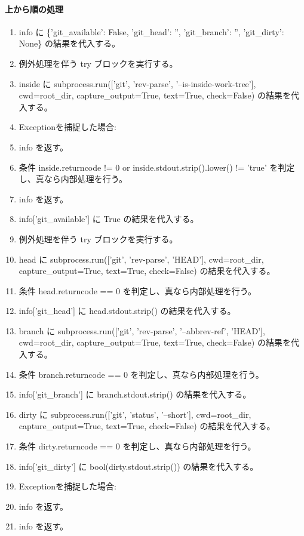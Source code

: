 \documentclass[a4paper,11pt]{article}
\begin{document}
            \paragraph{上から順の処理}
            \begin{enumerate}[leftmargin=1.8em]
            \item info に \{'git\_available': False, 'git\_head': '', 'git\_branch': '', 'git\_dirty': None\} の結果を代入する。
\item 例外処理を伴う try ブロックを実行する。
\item   inside に subprocess.run(['git', 'rev-parse', '--is-inside-work-tree'], cwd=root\_dir, capture\_output=True, text=True, check=False) の結果を代入する。
\item   Exceptionを捕捉した場合:
\item   info を返す。
\item 条件 inside.returncode != 0 or inside.stdout.strip().lower() != 'true' を判定し、真なら内部処理を行う。
\item   info を返す。
\item info['git\_available'] に True の結果を代入する。
\item 例外処理を伴う try ブロックを実行する。
\item   head に subprocess.run(['git', 'rev-parse', 'HEAD'], cwd=root\_dir, capture\_output=True, text=True, check=False) の結果を代入する。
\item   条件 head.returncode == 0 を判定し、真なら内部処理を行う。
\item     info['git\_head'] に head.stdout.strip() の結果を代入する。
\item   branch に subprocess.run(['git', 'rev-parse', '--abbrev-ref', 'HEAD'], cwd=root\_dir, capture\_output=True, text=True, check=False) の結果を代入する。
\item   条件 branch.returncode == 0 を判定し、真なら内部処理を行う。
\item     info['git\_branch'] に branch.stdout.strip() の結果を代入する。
\item   dirty に subprocess.run(['git', 'status', '--short'], cwd=root\_dir, capture\_output=True, text=True, check=False) の結果を代入する。
\item   条件 dirty.returncode == 0 を判定し、真なら内部処理を行う。
\item     info['git\_dirty'] に bool(dirty.stdout.strip()) の結果を代入する。
\item   Exceptionを捕捉した場合:
\item   info を返す。
\item info を返す。
            \end{enumerate}
\end{document}
